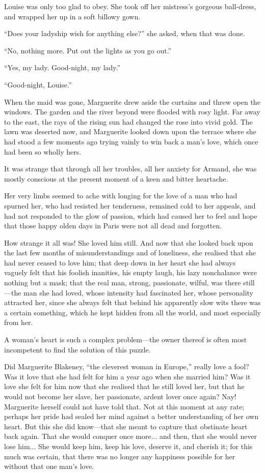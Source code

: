 \documentclass[paper=5.5in:8.5in,BCOR=7mm,twoside,DIV=calc,12pt,usegeometry,chapterprefix,endperiod,headings=big]{scrbook}
\begin{document}
Louise was only too glad to obey. She took off her mistress's gorgeous ball-dress, and wrapped her up in a soft billowy gown.

\enquote{Does your ladyship wish for anything else?} she asked, when that was done.

\enquote{No, nothing more. Put out the lights as you go out.}

\enquote{Yes, my lady. Good-night, my lady.}

\enquote{Good-night, Louise.}

When the maid was gone, Marguerite drew aside the curtains and threw open the windows. The garden and the river beyond were flooded with rosy light. Far away to the east, the rays of the rising sun had changed the rose into vivid gold. The lawn was deserted now, and Marguerite looked down upon the terrace where she had stood a few moments ago trying vainly to win back a man's love, which once had been so wholly hers.

It was strange that through all her troubles, all her anxiety for Armand, she was mostly conscious at the present moment of a keen and bitter heartache.

Her very limbs seemed to ache with longing for the love of a man who had spurned her, who had resisted her tenderness, remained cold to her appeals, and had not responded to the glow of passion, which had caused her to feel and hope that those happy olden days in Paris were not all dead and forgotten.

How strange it all was! She loved him still. And now that she looked back upon the last few months of misunderstandings and of loneliness, she realised that she had never ceased to love him; that deep down in her heart she had always vaguely felt that his foolish inanities, his empty laugh, his lazy nonchalance were nothing but a mask; that the real man, strong, passionate, wilful, was there still---the man she had loved, whose intensity had fascinated her, whose personality attracted her, since she always felt that behind his apparently slow wits there was a certain something, which he kept hidden from all the world, and most especially from her.

A woman's heart is such a complex problem---the owner thereof is often most incompetent to find the solution of this puzzle.

Did Marguerite Blakeney, \enquote{the cleverest woman in Europe,} really love a fool? Was it love that she had felt for him a year ago when she married him? Was it love she felt for him now that she realised that he still loved her, but that he would not become her slave, her passionate, ardent lover once again? Nay! Marguerite herself could not have told that. Not at this moment at any rate; perhaps her pride had sealed her mind against a better understanding of her own heart. But this she did know---that she meant to capture that obstinate heart back again. That she would conquer once more... and then, that she would never lose him... She would keep him, keep his love, deserve it, and cherish it; for this much was certain, that there was no longer any happiness possible for her without that one man's love.
\end{document}
